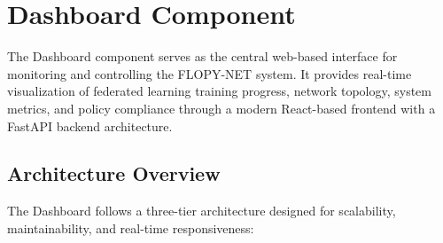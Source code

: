 \section{Dashboard Component}
\label{sec:dashboard-component}

The Dashboard component serves as the central web-based interface for monitoring and controlling the FLOPY-NET system. It provides real-time visualization of federated learning training progress, network topology, system metrics, and policy compliance through a modern React-based frontend \cite{react} with a FastAPI backend \cite{fastapi} architecture.

\subsection{Architecture Overview}

The Dashboard follows a three-tier architecture designed for scalability, maintainability, and real-time responsiveness:

